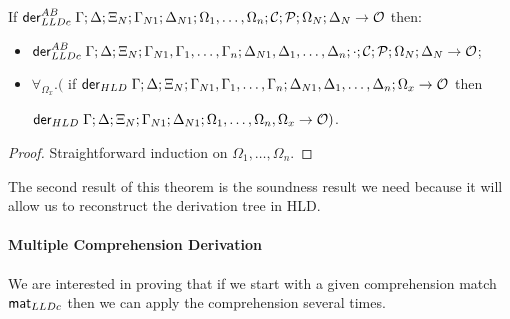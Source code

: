 \begin{theorem}\label{thm:comprehension_derivation}
If $\mathsf{der}_{LLDc}^{AB} \; \Gamma; \Delta; \Xi_N; \Gamma_{N1}; \Delta_{N1}; \Omega_1, \dotsc,
   \Omega_n; \mathcal{C}; \mathcal{P}; \Omega_N; \Delta_N \rightarrow \mathcal{O}$ then:

\begin{itemize}[leftmargin=*]
   \item $\mathsf{der}_{LLDc}^{AB} \; \Gamma; \Delta; \Xi_N; \Gamma_{N1}, \Gamma_1, \dotsc, \Gamma_n; \Delta_{N1},
   \Delta_1, \dotsc, \Delta_n; \cdot; \mathcal{C}; \mathcal{P}; \Omega_N; \Delta_N \rightarrow
   \mathcal{O}$;

   \item $\forall_{\Omega_x}.($ if $\mathsf{der}_{HLD} \; \Gamma; \Delta; \Xi_N;
   \Gamma_{N1}, \Gamma_1, \dotsc, \Gamma_n; \Delta_{N1}, \Delta_1, \dotsc,
   \Delta_n; \Omega_x \rightarrow \mathcal{O}$ then

   $\mathsf{der}_{HLD} \; \Gamma; \Delta; \Xi_N; \Gamma_{N1}; \Delta_{N1}; \Omega_1, \dotsc,
   \Omega_n, \Omega_x \rightarrow \mathcal{O})$.

\end{itemize}
\end{theorem}

\begin{proof}
Straightforward induction on $\Omega_1, \dotsc, \Omega_n$.
\end{proof}

The second result of this theorem is the soundness result we need because it will allow us to reconstruct the derivation tree in HLD.


\paragraph{Multiple Comprehension Derivation} We are interested in proving that
if we start with a given comprehension match $\mathsf{mat}_{LLDc}$ then we can apply the
comprehension several times.

